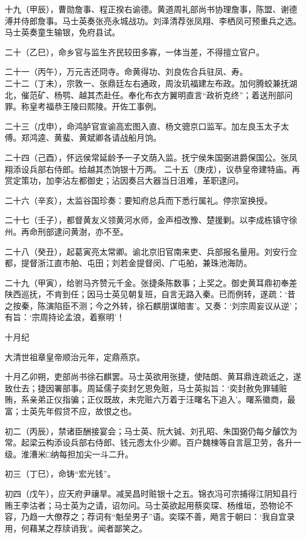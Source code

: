 \documentclass[]{article}
\begin{document}
十九（甲辰），曹勋詹事、程正揆右谕德。黄道周礼部尚书协理詹事，陈盟、谢德溥并侍郎詹事。马士英奏张亮永城战功。刘泽清荐张凤翔、李栖凤可预重兵之选。马士英奏童生输银，免府县试。

二十（乙巳），命乡官与监生齐民较田多寡，一体当差，不得擅立官户。

二十一（丙午），万元吉还冏寺。命黄得功、刘良佐合兵驻凤、寿。\\
二十二（丁未），宗敦一、张鼎廷左右通政，周汝玑福建左布政。加何腾蛟兼抚湖北，催范矿、杨鹗、越其杰赴任。奉化布衣方翼明直言``政祈克终''；着送刑部问罪。称皇考福恭王陵曰熙陵。开佐工事例。

二十三（戊申），命鸿胪官宣谕高宏图入直、杨文骢京口监军。加左良玉太子太傅。郑鸿逵、黄蜚、黄斌卿各请战船月饷。

二十四（己酉），怀远侯常延龄予一子文荫入监。抚宁侯朱国弼进爵保国公。张凤翔添设兵部右侍郎。给越其杰饷银十万两。
二十五（庚戌），议恭皇帝建特庙。再赏定策功，加李沾左都御史；沾因奏吕大器当日沮难，革职逮问。

二十六（辛亥），太监谷国珍奏：要知府总兵而下悉行属礼。停宗室换授。

二十七（壬子），都督黄友义领黄河水师，金声桓改豫、楚援剿。以李成栋镇守徐州。再命刑部逮问黄澍，亦不至。

二十八（癸丑），起葛寅亮太常卿。谕北京旧官南来吏、兵部报名量用。刘安行佥都，提督浙江直市舶、屯田；刘若金提督闵、广屯舶，兼珠池海防。

二十九（甲寅），给驸马齐赞元千金。张捷条陈数事；上奖之。御史黄耳鼎初奉差陕西巡抚，不肯到任；因马士英见朝复班，自言无路入秦。已而例转，遂疏：`昔之按秦，陈演陷臣不测；今之外转，徐石麒朋谋暗害'。又奏：`刘宗周妄议从逆'；有旨：`宗周持论孟浪，着察明'！

十月纪

大清世祖章皇帝顺治元年，定鼎燕京。

十月乙卯朔，吏部尚书徐石麒罢。马士英欲用张捷，使陆朗、黄耳鼎连疏诋之，遂致仕去；捷因署部事。周延儒子奕封乞恩免赃，马士英拟旨：`奕封赦免罪辅赃贿，系亲弟正仪指骗；正仪既故，未完赃六万着于汪曙名下追入'。曙系徽商，最富；士英先年假贷不应，故恨之也。

初二（丙辰），禁诸臣酬接宴会；马士英、阮大铖、刘孔昭、朱国弼仍每夕醵饮为常。起梁云构添设兵部右侍郎、钱元悫太仆少卿。百户魏楝等自言扈卫劳，各升一级。淮漕米□纳每担加尖一斗二升。

初三（丁巳），命铸``宏光钱''。

初四（戊午），应天府尹禳旱。减吴昌时赃银十之五。锦衣冯可宗捕得江阴知县行贿王李沽者；马士英为之请，诏勿问。马士英欲起用蔡奕琛、杨维垣，恐物论不容，乃趋一大僚荐之；荐词有``魁垒男子''语。奕琛不善，飏言于朝曰：`我自宜录用，何藉某之荐牍诮我'。闻者鄙笑之。
\end{document}
